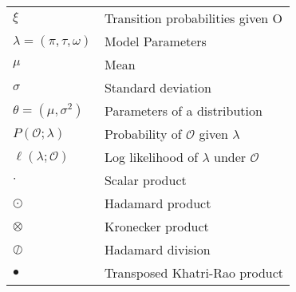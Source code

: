 \begin{table}[htb!]
\begin{tabular}{ll}
        $\xi$                           & Transition probabilities given O                \\
        $\lambda = (\pi, \tau, \omega)$ & Model Parameters                                \\
        $\mu$                           & Mean                                            \\
        $\sigma$                        & Standard deviation                              \\
        $\theta = (\mu, \sigma^2)$      & Parameters of a distribution                    \\
        $P(\mathcal{O}; \lambda)$       & Probability of $\mathcal{O}$ given $\lambda$    \\
        $\ell(\lambda ;\mathcal{O})$    & Log likelihood of $\lambda$ under $\mathcal{O}$ \\
        $\cdot$                         & Scalar product                                  \\
        $\odot$                         & Hadamard product                                \\
        $\otimes$                       & Kronecker product                               \\
        $\oslash$                       & Hadamard division                               \\
        $\smblkcircle$                  & Transposed Khatri-Rao product                   \\
        \bottomrule
    \end{tabular}
    \label{tab:symbol-table}
\end{table}
